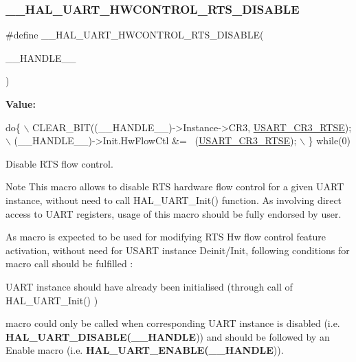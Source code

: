 \subsubsection{\texorpdfstring{\+\_\+\+\_\+\+H\+A\+L\+\_\+\+U\+A\+R\+T\+\_\+\+H\+W\+C\+O\+N\+T\+R\+O\+L\+\_\+\+R\+T\+S\+\_\+\+D\+I\+S\+A\+B\+LE}{\_\_HAL\_UART\_HWCONTROL\_RTS\_DISABLE}}
{\footnotesize\ttfamily \#define \+\_\+\+\_\+\+H\+A\+L\+\_\+\+U\+A\+R\+T\+\_\+\+H\+W\+C\+O\+N\+T\+R\+O\+L\+\_\+\+R\+T\+S\+\_\+\+D\+I\+S\+A\+B\+LE(\begin{DoxyParamCaption}\item[{}]{\+\_\+\+\_\+\+H\+A\+N\+D\+L\+E\+\_\+\+\_\+ }\end{DoxyParamCaption})}

{\bfseries Value\+:}
\begin{DoxyCode}
\textcolor{keywordflow}{do}\{                                                      \(\backslash\)
    CLEAR\_BIT((\_\_HANDLE\_\_)->Instance->CR3, \hyperlink{group___peripheral___registers___bits___definition_ga7c5d6fcd84a4728cda578a0339b4cac2}{USART\_CR3\_RTSE});\(\backslash\)
    (\_\_HANDLE\_\_)->Init.HwFlowCtl &= ~(\hyperlink{group___peripheral___registers___bits___definition_ga7c5d6fcd84a4728cda578a0339b4cac2}{USART\_CR3\_RTSE});     \(\backslash\)
  \} \textcolor{keywordflow}{while}(0)
\end{DoxyCode}


Disable R\+TS flow control. 

\begin{DoxyNote}{Note}
This macro allows to disable R\+TS hardware flow control for a given U\+A\+RT instance, without need to call H\+A\+L\+\_\+\+U\+A\+R\+T\+\_\+\+Init() function. As involving direct access to U\+A\+RT registers, usage of this macro should be fully endorsed by user. 

As macro is expected to be used for modifying R\+TS Hw flow control feature activation, without need for U\+S\+A\+RT instance Deinit/\+Init, following conditions for macro call should be fulfilled \+:
\begin{DoxyItemize}
\item U\+A\+RT instance should have already been initialised (through call of H\+A\+L\+\_\+\+U\+A\+R\+T\+\_\+\+Init() )
\item macro could only be called when corresponding U\+A\+RT instance is disabled (i.\+e. {\bfseries H\+A\+L\+\_\+\+U\+A\+R\+T\+\_\+\+D\+I\+S\+A\+B\+LE(\+\_\+\+\_\+\+H\+A\+N\+D\+LE})) and should be followed by an Enable macro (i.\+e. {\bfseries H\+A\+L\+\_\+\+U\+A\+R\+T\+\_\+\+E\+N\+A\+B\+LE(\+\_\+\+\_\+\+H\+A\+N\+D\+LE})). 
\end{DoxyItemize}
\end{DoxyNote}

